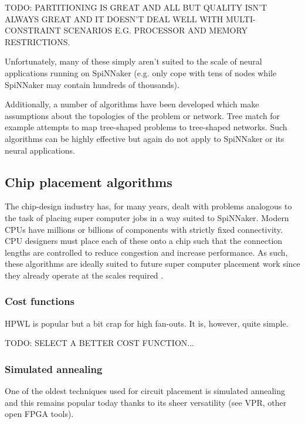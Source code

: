 				TODO: PARTITIONING IS GREAT AND ALL BUT QUALITY ISN'T ALWAYS GREAT AND
				IT DOESN'T DEAL WELL WITH MULTI-CONSTRAINT SCENARIOS E.G. PROCESSOR AND
				MEMORY RESTRICTIONS.
				
				Unfortunately, many of these simply aren't suited to the scale of
				neural applications running on SpiNNaker (e.g. only cope with tens of
				nodes while SpiNNaker may contain hundreds of thousands).
				
				Additionally, a number of algorithms have been developed which make
				assumptions about the topologies of the problem or network. Tree match
				for example attempts to map tree-shaped problems to tree-shaped
				networks. Such algorithms can be highly effective but again do not
				apply to SpiNNaker or its neural applications.
		
		\subsection{Chip placement algorithms}
			
			The chip-design industry has, for many years, dealt with problems
			analogous to the task of placing super computer jobs in a way suited to
			SpiNNaker. Modern CPUs have millions or billions of components with
			strictly fixed connectivity. CPU designers must place each of these onto
			a chip such that the connection lengths are controlled to reduce
			congestion and increase performance. As such, these algorithms are
			ideally suited to future super computer placement work since they already
			operate at the scales required \cite{nam07}.
			
			\subsubsection{Cost functions}
				
				HPWL is popular but a bit crap for high fan-outs. It is, however, quite
				simple.
				
				TODO: SELECT A BETTER COST FUNCTION...
			
			\subsubsection{Simulated annealing}
				
				One of the oldest techniques used for circuit placement is simulated
				annealing and this remains popular today thanks to its sheer
				versatility (see VPR, other open FPGA tools).
				
